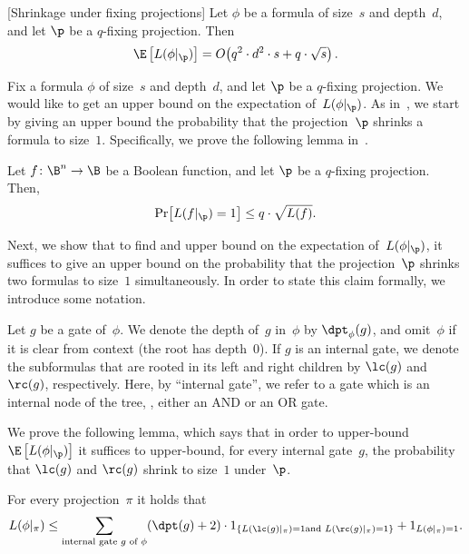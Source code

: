 \begin{restated}{}[Shrinkage under fixing projections]
Let $\phi$ be a formula of size~$s$ and depth~$d$, and let
$\p$ be a $q$-fixing projection. Then 
\[
\E\left[L(\phi|_{\p})\right]=O\!\left(q^{2}\cdot d^{2}\cdot s+q\cdot\sqrt{s}\right).
\]
\end{restated}

Fix a formula $\phi$ of size~$s$ and depth~$d$, and let $\p$
be a $q$-fixing projection. We would like to
%
get an upper bound on  %
the expectation
of~$L(\phi|_{\p})$. As in~\cite{H98}, we start by 
%
giving an upper bound %
the probability that the projection~$\p$ shrinks a formula to size~$1$.
Specifically, we prove the following lemma in~. 
\begin{lemma}
\label{lemma:shrinkage-to-single-literal}Let $f\colon\B^{n}\to\B$ be a
Boolean function, and let $\p$ be a $q$-fixing projection. Then,
\[
\Pr\!\left[L(f|_{\p})=1\right]\le q\cdot\sqrt{L(f)}.
\]
\end{lemma}

Next, we show that to %
find and upper bound on %
the expectation of~$L(\phi|_{\p})$,
it suffices to %
give an upper bound on %
the probability that the projection~$\p$
shrinks two formulas to size~$1$ simultaneously. In order to state
this claim formally, we introduce some notation. 
\begin{notation}
Let $g$ be a gate of~$\phi$. We denote the depth of~$g$ in~$\phi$
by $\dpt_{\phi}(g)$, and omit~$\phi$ if it is clear from context
(the root has depth~$0$). If $g$ is an internal gate, we denote
the %
subformulas  %
that are rooted in its left and right children by
$\lc(g)$ and $\rc(g)$, respectively. Here, by ``internal gate'',
we refer to a gate which is an internal node of the tree, \ie, either
an AND or an OR gate.
\end{notation}

We prove the following lemma, which says that in order to upper-bound
$\E\left[L(\phi|_{\p})\right]$ it suffices to upper-bound, for every
internal gate~$g$, the probability that $\lc(g)$ and $\rc(g)$
shrink to size~$1$ under~$\p$. 
\begin{lemma}
\label{lemma:reduction-to-size-2}For every projection~$\pi$ it holds
that   %
\[
L(\phi|_{\pi})\le\sum_{\text{\rm internal gate \ensuremath{g} of \ensuremath{\phi}}}(\dpt(g)+2)\cdot1_{\left\{ L(\lc(g)|_{\pi})=1\text{\rm  and }L(\rc(g)|_{\pi})=1\right\} }+1_{L(\phi|_{\pi})=1}.
\]
\end{lemma}

